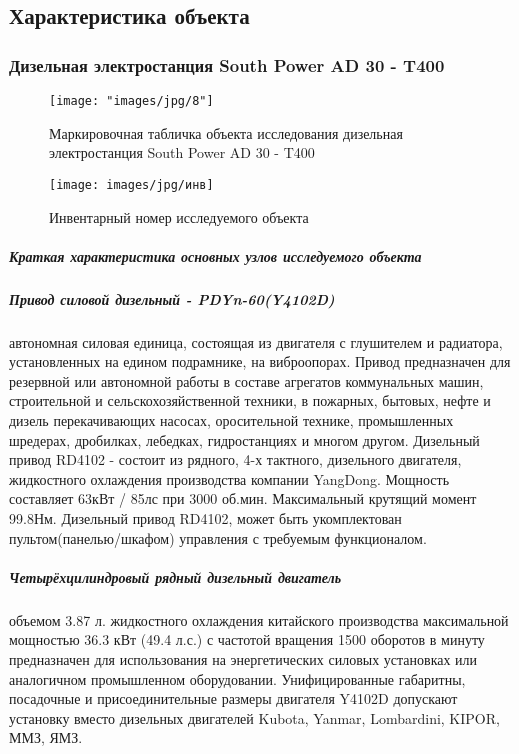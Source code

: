 \subsection{ Характеристика объекта }
\subsubsection{Дизельная электростанция South Power AD 30 - T400}



\begin{figure}[H]
	\centering
	\texttt{[image: "images/jpg/8"]}
	\caption[]{Маркировочная табличка объекта исследования дизельная электростанция South Power AD 30 - T400}
\end{figure}

\begin{figure}[H]
	\centering
	\texttt{[image: images/jpg/инв]}
	\caption{Инвентарный номер исследуемого объекта}
	\label{fig:инв}
\end{figure}



\subparagraph{Краткая характеристика основных узлов исследуемого объекта}

\subparagraph{Привод силовой дизельный - PDYn-60(Y4102D)} автономная силовая единица, состоящая из двигателя с глушителем и радиатора, установленных на едином подрамнике, на виброопорах. Привод предназначен для резервной или автономной работы в составе агрегатов коммунальных машин, строительной и сельскохозяйственной техники, в пожарных, бытовых, нефте и дизель перекачивающих насосах, оросительной технике, промышленных шредерах, дробилках, лебедках, гидростанциях и многом другом. Дизельный привод RD4102 - состоит из рядного, 4-х тактного, дизельного двигателя, жидкостного охлаждения производства компании YangDong. Мощность составляет 63кВт / 85лс при 3000 об.мин. Максимальный крутящий момент 99.8Нм. Дизельный привод RD4102, может быть укомплектован пультом(панелью/шкафом) управления с требуемым функционалом.

%
%
\subparagraph{Четырёхцилиндровый рядный дизельный двигатель} объемом 3.87 л. жидкостного охлаждения китайского производства максимальной мощностью 36.3 кВт (49.4 л.с.) с частотой вращения 1500 оборотов в минуту предназначен для использования на энергетических силовых установках или аналогичном промышленном оборудовании.  Унифицированные габаритны, посадочные и присоединительные размеры двигателя Y4102D допускают установку вместо дизельных двигателей Kubota, Yanmar, Lombardini, KIPOR, ММЗ, ЯМЗ.

